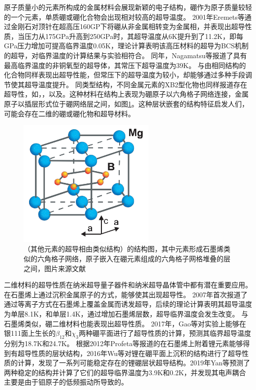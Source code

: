 原子质量小的元素所构成的金属材料会展现新颖的电子结构，硼作为原子质量较轻的一个元素，单质硼或硼化合物会出现相对较高的超导温度。
2001年Eremets等\cite{eremets2001superconductivity}通过金刚石对顶针在超高压160GP下将硼从非金属相转变为金属相，并表现出超导性质，当压力从175GPa升高到250GPa时，其超导温度从6K提升到了11.2K，即每GPa压力增加可提高临界温度0.05K，理论计算表明该高压材料的超导为BCS机制的超导，对临界温度的计算结果与实验相符合。
同年，Nagamatsu等\cite{nagamatsu2001superconductivity}报道了具有最高临界温度的非铜氧型的超导体\cite{buzea2001review}，其常压下超导温度为39K。
与由相同结构的化合物同样表现出超导性能，但常压下的超导温度为较小，却能够通过多种手段调节使其超导温度提升。
同类型结构，不同金属元素的XB2型化物也同样报道存在超导性，如，\cite{barbero2017doping}，\cite{mudgel2008superconductivity}以及\cite{singh2001superconductivity}。这种材料在结构上表现为硼原子以六角格子网络连接，金属原子以插层形式位于硼网络层之间，如图\ref{fig:ch1_mgb2}。这种层状嵌套的结构特征启发人们，可能会存在二维的硼或硼化物和超导材料。

\begin{figure}
  \includegraphics[width=0.60\textwidth]{figs/ch1_mgb2.png}
  \centering
  \caption{（其他元素的超导相由类似结构）的结构图，其中元素形成石墨烯类似的六角格子网络，原子嵌入在硼元素组成的六角格子网格堆叠的层之间，图片来源文献\cite{buzea2001review}}
  \label{fig:ch1_mgb2}
\end{figure}

二维材料的超导性质在纳米超导量子器件\cite{pribiag2015edge}和纳米超导晶体管\cite{el2013superconductivity}中都有潜在重要应用。在石墨烯上通过沉积金属原子的方式，能够使其出现超导性。
2007年首次报道了通过等离子方式在石墨烯上覆盖金属而诱发超导\cite{uchoa2007superconducting}，后续的理论计算表明其超导温度为单层8.1K\cite{gholami2018superconducting}，和单层1.4K\cite{yang2014superconducting}，通过增加石墨烯层数，超导临界温度会发生改变。
与石墨烯类似，硼二维材料也能表现出超导性质。
2017年，Gao等\cite{gao2017prediction}对实验上能够在银111面上生长的$\beta_{12}$和$\chi_3$两种硼平面进行了超导性质的计算，预测其临界超导温度分别为18.7K和24.7K。
根据2012年Profeta等\cite{profeta2012phonon}报道的在石墨烯上附着锂元素能够得到有超导性质的层状结构，2016年Wu等\cite{wu2016lithium}对锂在硼平面上沉积的结构进行了超导性质的计算，发现了一系列可能稳定存在的锂硼层状超导结构。2019年Yan等\cite{yan2019prediction}预测了两种稳定的结构并计算了它们的超导临界温度为3.9K和0.2K，并发现其电声耦合主要是由于钼原子的低频振动所导致的。

